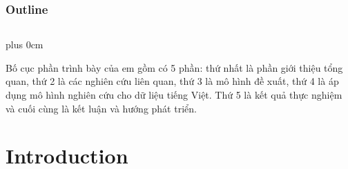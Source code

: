 \documentclass[11pt]{beamer}
\renewcommand{\raggedright}{\leftskip=0pt \rightskip=0pt plus 0cm}
\let\olditemize=\itemize
\renewenvironment{itemize}{\olditemize\raggedright}{\endlist}
\begin{document}
\begin{frame}[plain]
	\frametitle{Outline}
	\begin{columns}[t]
		\begin{column}{.5\textwidth}
			\tableofcontents[sections={1-3}]
		\end{column}
		\begin{column}{.5\textwidth}
			\tableofcontents[sections={4-6}]
		\end{column}
	\end{columns}
\end{frame}
\begin{frame}
	\begin{itemize}
		\item Bố cục phần trình bày của em gồm có 5 phần: thứ nhất là phần giới thiệu tổng quan, thứ 2 là các nghiên cứu liên quan, thứ 3 là mô hình đề xuất, thứ 4 là áp dụng mô hình nghiên cứu cho dữ liệu tiếng Việt. Thứ 5 là kết quả thực nghiệm và cuối cùng là kết luận và hướng phát triển.
	\end{itemize}
\end{frame}
\section{Introduction}
\end{document}
